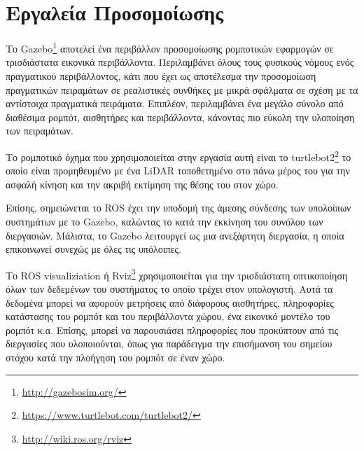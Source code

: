 \section{Εργαλεία Προσομοίωσης}
\label{section:simulation_tools}

Το Gazebo\footnote{\href{http://gazebosim.org/}{http://gazebosim.org/}} αποτελεί ένα περιβάλλον προσομοίωσης ρομποτικών εφαρμογών σε τρισδιάστατα εικονικά περιβάλλοντα. Περιλαμβάνει όλους τους φυσικούς νόμους ενός πραγματικού περιβάλλοντος, κάτι που έχει ως αποτέλεσμα την προσομοίωση πραγματικών πειραμάτων σε ρεαλιστικές συνθήκες με μικρά σφάλματα σε σχέση με τα αντίστοιχα πραγματικά πειράματα. Επιπλέον, περιλαμβάνει ένα μεγάλο σύνολο από διαθέσιμα ρομπότ, αισθητήρες και περιβάλλοντα, κάνοντας πιο εύκολη την υλοποίηση των πειραμάτων.

Το ρομποτικό όχημα που χρησιμοποιείται στην εργασία αυτή είναι το turtlebot2\footnote{\href{https://www.turtlebot.com/turtlebot2/}{https://www.turtlebot.com/turtlebot2/}} το οποίο είναι προμηθευμένο με ένα LiDAR τοποθετημένο στο πάνω μέρος του για την ασφαλή κίνηση και την ακριβή εκτίμηση της θέσης του στον χώρο.

Επίσης, σημειώνεται το ROS έχει την υποδομή της άμεσης σύνδεσης των υπολοίπων συστημάτων με το Gazebo, καλώντας το κατά την εκκίνηση του συνόλου των διεργασιών. Μάλιστα, το Gazebo λειτουργεί ως μια ανεξάρτητη διεργασία, η οποία επικοινωνεί συνεχώς με όλες τις υπόλοιπες. 

Το ROS visualiziation ή Rviz\footnote{\href{http://wiki.ros.org/rviz}{http://wiki.ros.org/rviz}} χρησιμοποιείται για την τρισδιάστατη οπτικοποίηση όλων των δεδεμένων του συστήματος το οποίο τρέχει στον υπολογιστή. Αυτά τα δεδομένα μπορεί να αφορούν μετρήσεις από διάφορους αισθητήρες, πληροφορίες κατάστασης του ρομπότ και του περιβάλλοντα χώρου, ένα εικονικό μοντέλο του ρομπότ κ.α. Επίσης, μπορεί να παρουσιάσει πληροφορίες που προκύπτουν από τις διεργασίες που υλοποιούνται, όπως για παράδειγμα την επισήμανση του σημείου στόχου κατά την πλοήγηση του ρομπότ σε έναν χώρο.


